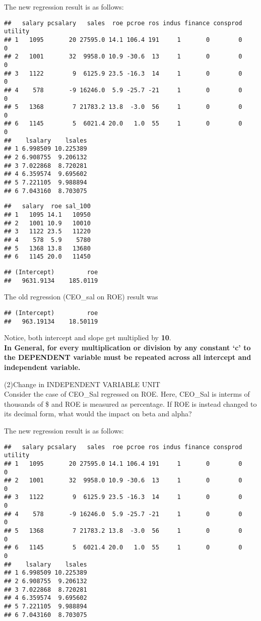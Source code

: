 \documentclass[
]{article}
\begin{document}
The new regression result is as follows:

\begin{verbatim}
##   salary pcsalary   sales  roe pcroe ros indus finance consprod utility
## 1   1095       20 27595.0 14.1 106.4 191     1       0        0       0
## 2   1001       32  9958.0 10.9 -30.6  13     1       0        0       0
## 3   1122        9  6125.9 23.5 -16.3  14     1       0        0       0
## 4    578       -9 16246.0  5.9 -25.7 -21     1       0        0       0
## 5   1368        7 21783.2 13.8  -3.0  56     1       0        0       0
## 6   1145        5  6021.4 20.0   1.0  55     1       0        0       0
##    lsalary    lsales
## 1 6.998509 10.225389
## 2 6.908755  9.206132
## 3 7.022868  8.720281
## 4 6.359574  9.695602
## 5 7.221105  9.988894
## 6 7.043160  8.703075
\end{verbatim}

\begin{verbatim}
##   salary  roe sal_100
## 1   1095 14.1   10950
## 2   1001 10.9   10010
## 3   1122 23.5   11220
## 4    578  5.9    5780
## 5   1368 13.8   13680
## 6   1145 20.0   11450
\end{verbatim}

\begin{verbatim}
## (Intercept)         roe 
##   9631.9134    185.0119
\end{verbatim}

The old regression (CEO\_sal on ROE) result was

\begin{verbatim}
## (Intercept)         roe 
##   963.19134    18.50119
\end{verbatim}

Notice, both intercept and slope get multiplied by \textbf{10}.\\
\textbf{In General, for every multiplication or division by any constant
`c' to the DEPENDENT variable must be repeated across all intercept and
independent variable.}

(2)Change in INDEPENDENT VARIABLE UNIT\\
Consider the case of CEO\_Sal regressed on ROE. Here, CEO\_Sal is
interms of thousands of \$ and ROE is measured as percentage. If ROE is
instead changed to its decimal form, what would the impact on beta and
alpha?

The new regression result is as follows:

\begin{verbatim}
##   salary pcsalary   sales  roe pcroe ros indus finance consprod utility
## 1   1095       20 27595.0 14.1 106.4 191     1       0        0       0
## 2   1001       32  9958.0 10.9 -30.6  13     1       0        0       0
## 3   1122        9  6125.9 23.5 -16.3  14     1       0        0       0
## 4    578       -9 16246.0  5.9 -25.7 -21     1       0        0       0
## 5   1368        7 21783.2 13.8  -3.0  56     1       0        0       0
## 6   1145        5  6021.4 20.0   1.0  55     1       0        0       0
##    lsalary    lsales
## 1 6.998509 10.225389
## 2 6.908755  9.206132
## 3 7.022868  8.720281
## 4 6.359574  9.695602
## 5 7.221105  9.988894
## 6 7.043160  8.703075
\end{verbatim}
\end{document}

